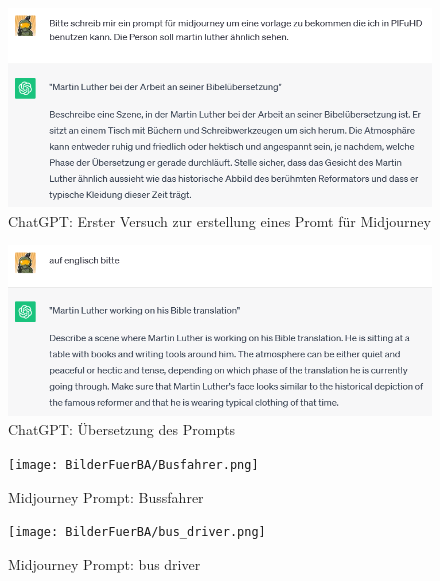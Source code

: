 \begin{figure}
	\centering
	\includegraphics[width=14cm]{BilderFuerBA/02.png}
	\caption{ChatGPT: Erster Versuch zur erstellung eines Promt für Midjourney}
	\label{ChatGPT_erster_Versuch_Midjourney_Promt}
\end{figure}

\begin{figure}
	\centering
	\includegraphics[width=14cm]{BilderFuerBA/03.png}
	\caption{ChatGPT: Übersetzung des Prompts}
	\label{ChatGPT_übersetzen}
\end{figure}

\begin{figure}
	\centering
	\begin{minipage}[t]{0.45\linewidth}
		\centering
		\texttt{[image: BilderFuerBA/Busfahrer.png]}
		\caption{Midjourney Prompt: Bussfahrer}
		\label{Bussfahrer}
	\end{minipage}
	\hfill
	\begin{minipage}[t]{0.45\linewidth}
		\centering
		\texttt{[image: BilderFuerBA/bus\_driver.png]}
		\caption{Midjourney Prompt: bus driver}
		\label{bus_driver}
	\end{minipage}
\end{figure}



